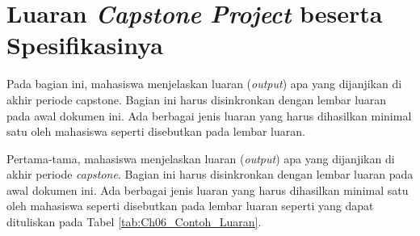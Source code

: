 
\section{Luaran \textit{Capstone Project} beserta Spesifikasinya}
\label{sec:Luaran_Spesifikasi}
    
    Pada bagian ini, mahasiswa menjelaskan luaran (\textit{output}) apa yang dijanjikan di akhir periode capstone. Bagian ini harus disinkronkan dengan lembar luaran pada awal dokumen ini. Ada berbagai jenis luaran yang harus dihasilkan minimal satu oleh mahasiswa seperti disebutkan pada lembar luaran.

    Pertama-tama, mahasiswa menjelaskan luaran (\textit{output}) apa yang dijanjikan di akhir periode \textit{capstone}. Bagian ini harus disinkronkan dengan lembar luaran pada awal dokumen ini. Ada berbagai jenis luaran yang harus dihasilkan minimal satu oleh mahasiswa seperti disebutkan pada lembar luaran seperti yang dapat dituliskan pada Tabel \ref{tab:Ch06_Contoh_Luaran}.
    
